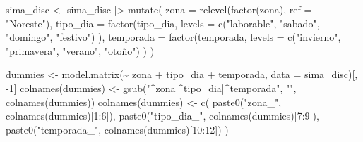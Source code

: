 \documentclass[
  spanish,
  letterpaper,
  DIV=11,
  numbers=noendperiod]{scrartcl}
\newenvironment{Shaded}{\begin{snugshade}}{\end{snugshade}}
\newcommand{\AttributeTok}[1]{\textcolor[rgb]{0.40,0.45,0.13}{#1}}
\newcommand{\DecValTok}[1]{\textcolor[rgb]{0.68,0.00,0.00}{#1}}
\newcommand{\FunctionTok}[1]{\textcolor[rgb]{0.28,0.35,0.67}{#1}}
\newcommand{\NormalTok}[1]{\textcolor[rgb]{0.00,0.23,0.31}{#1}}
\newcommand{\OtherTok}[1]{\textcolor[rgb]{0.00,0.23,0.31}{#1}}
\newcommand{\SpecialCharTok}[1]{\textcolor[rgb]{0.37,0.37,0.37}{#1}}
\newcommand{\StringTok}[1]{\textcolor[rgb]{0.13,0.47,0.30}{#1}}
\begin{document}
\begin{Shaded}
\begin{Highlighting}[]
\NormalTok{sima\_disc }\OtherTok{\textless{}{-}}\NormalTok{ sima\_disc }\SpecialCharTok{|\textgreater{}}
    \FunctionTok{mutate}\NormalTok{(}
        \AttributeTok{zona =} \FunctionTok{relevel}\NormalTok{(}\FunctionTok{factor}\NormalTok{(zona), }\AttributeTok{ref =} \StringTok{"Noreste"}\NormalTok{),}
        \AttributeTok{tipo\_dia =} \FunctionTok{factor}\NormalTok{(tipo\_dia,}
            \AttributeTok{levels =} \FunctionTok{c}\NormalTok{(}\StringTok{"laborable"}\NormalTok{, }\StringTok{"sabado"}\NormalTok{, }\StringTok{"domingo"}\NormalTok{, }\StringTok{"festivo"}\NormalTok{)}
\NormalTok{        ),}
        \AttributeTok{temporada =} \FunctionTok{factor}\NormalTok{(temporada,}
            \AttributeTok{levels =} \FunctionTok{c}\NormalTok{(}\StringTok{"invierno"}\NormalTok{, }\StringTok{"primavera"}\NormalTok{, }\StringTok{"verano"}\NormalTok{, }\StringTok{"otoño"}\NormalTok{)}
\NormalTok{        )}
\NormalTok{    )}

\NormalTok{dummies }\OtherTok{\textless{}{-}} \FunctionTok{model.matrix}\NormalTok{(}\SpecialCharTok{\textasciitilde{}}\NormalTok{ zona }\SpecialCharTok{+}\NormalTok{ tipo\_dia }\SpecialCharTok{+}\NormalTok{ temporada, }\AttributeTok{data =}\NormalTok{ sima\_disc)[, }\SpecialCharTok{{-}}\DecValTok{1}\NormalTok{]}
\FunctionTok{colnames}\NormalTok{(dummies) }\OtherTok{\textless{}{-}} \FunctionTok{gsub}\NormalTok{(}\StringTok{"\^{}zona|\^{}tipo\_dia|\^{}temporada"}\NormalTok{, }\StringTok{""}\NormalTok{, }\FunctionTok{colnames}\NormalTok{(dummies))}
\FunctionTok{colnames}\NormalTok{(dummies) }\OtherTok{\textless{}{-}} \FunctionTok{c}\NormalTok{(}
    \FunctionTok{paste0}\NormalTok{(}\StringTok{"zona\_"}\NormalTok{, }\FunctionTok{colnames}\NormalTok{(dummies)[}\DecValTok{1}\SpecialCharTok{:}\DecValTok{6}\NormalTok{]),}
    \FunctionTok{paste0}\NormalTok{(}\StringTok{"tipo\_dia\_"}\NormalTok{, }\FunctionTok{colnames}\NormalTok{(dummies)[}\DecValTok{7}\SpecialCharTok{:}\DecValTok{9}\NormalTok{]),}
    \FunctionTok{paste0}\NormalTok{(}\StringTok{"temporada\_"}\NormalTok{, }\FunctionTok{colnames}\NormalTok{(dummies)[}\DecValTok{10}\SpecialCharTok{:}\DecValTok{12}\NormalTok{])}
\NormalTok{)}


\end{Highlighting}
\end{Shaded}
\end{document}
